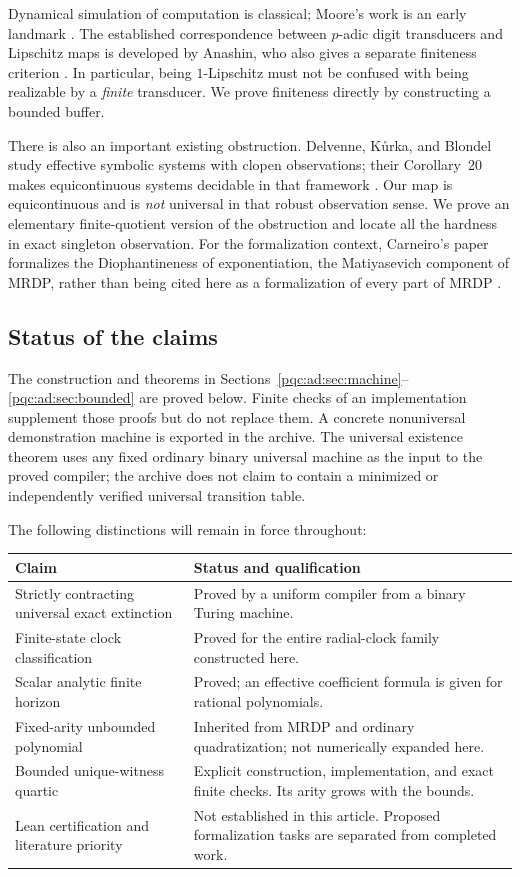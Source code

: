 \documentclass[11pt,letterpaper]{article}
\numberwithin{equation}{section}
\theoremstyle{definition}
\theoremstyle{remark}
\begin{document}
Dynamical simulation of computation is classical; Moore's work is an early
landmark \cite{b62-moore1990}. The established correspondence between $p$-adic digit
transducers and Lipschitz maps is developed by Anashin, who also gives a
separate finiteness criterion \cite{b62s12-anashin}. In particular, being
$1$-Lipschitz must not be confused with being realizable by a \emph{finite}
transducer. We prove finiteness directly by constructing a bounded buffer.

There is also an important existing obstruction. Delvenne, K\r{u}rka, and
Blondel study effective symbolic systems with clopen observations; their
Corollary~20 makes equicontinuous systems decidable in that framework
\cite{b62s12-delvenne}. Our map is equicontinuous and is \emph{not} universal in
that robust observation sense. We prove an elementary finite-quotient
version of the obstruction and locate all the hardness in exact singleton
observation. For the formalization context, Carneiro's paper formalizes the
Diophantineness of exponentiation, the Matiyasevich component of MRDP, rather
than being cited here as a formalization of every part of MRDP
\cite{b62s12-carneiro}.

\subsection{Status of the claims}
The construction and theorems in Sections~\ref{pqc:ad:sec:machine}--\ref{pqc:ad:sec:bounded}
are proved below. Finite checks of an implementation supplement those
proofs but do not replace them. A concrete nonuniversal demonstration
machine is exported in the archive. The universal existence theorem uses
any fixed ordinary binary universal machine as the input to the proved
compiler; the archive does not claim to contain a minimized or independently
verified universal transition table.

The following distinctions will remain in force throughout:
\begin{center}
\begin{tabularx}{\textwidth}{@{}p{}X@{}}
\toprule
Claim & Status and qualification\\
\midrule
Strictly contracting universal exact extinction & Proved by a uniform
compiler from a binary Turing machine.\\
Finite-state clock classification & Proved for the entire radial-clock
family constructed here.\\
Scalar analytic finite horizon & Proved; an effective coefficient formula
is given for rational polynomials.\\
Fixed-arity unbounded polynomial & Inherited from MRDP and ordinary
quadratization; not numerically expanded here.\\
Bounded unique-witness quartic & Explicit construction, implementation,
and exact finite checks. Its arity grows with the bounds.\\
Lean certification and literature priority & Not established in this
article. Proposed formalization tasks are separated from completed work.\\
\bottomrule
\end{tabularx}
\end{center}
\end{document}
